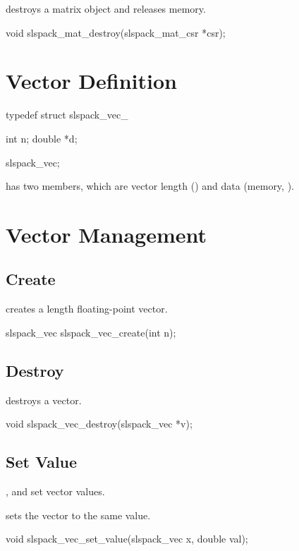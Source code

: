  destroys a matrix object and releases memory.
\begin{evb}
void slspack_mat_destroy(slspack_mat_csr *csr);
\end{evb}

\section{Vector Definition}

\begin{evb}
typedef struct slspack_vec_
{
    int n;
    double *d;

} slspack_vec;
\end{evb}

 has two members, which are vector length () and data (memory,
).

\section{Vector Management}

\subsection{Create}
 creates a length  floating-point vector.
\begin{evb}
slspack_vec slspack_vec_create(int n);
\end{evb}

\subsection{Destroy}

 destroys a vector.
\begin{evb}
void slspack_vec_destroy(slspack_vec *v);
\end{evb}

\subsection{Set Value}
,  and 
set vector values.

 sets the vector to the same value.
\begin{evb}
void slspack_vec_set_value(slspack_vec x, double val);
\end{evb}


